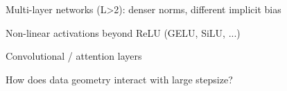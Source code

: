 \documentclass[preview]{standalone}
\begin{document}
Multi-layer networks (L>2): denser norms, different implicit bias\\Non-linear activations beyond ReLU (GELU, SiLU, ...)\\Convolutional / attention layers\\How does data geometry interact with large stepsize?\\
\end{document}
